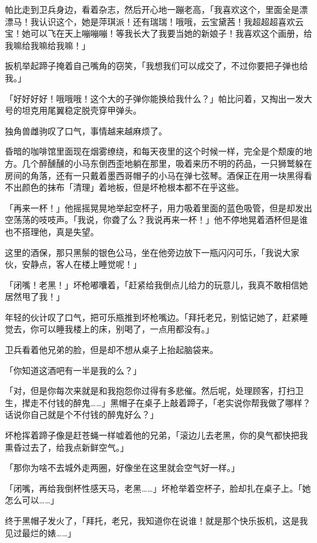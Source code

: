 帕比走到卫兵身边，看着杂志，然后开心地一蹦老高，「我喜欢这个，里面全是漂漂马！我认识这个，她是萍琪派！还有瑞瑞！哦哦，云宝黛茜！我超超超喜欢云宝！她可以飞在天上嘣嘣嘣！等我长大了我要当她的新娘子！我喜欢这个画册，给我嘛给我嘛给我嘛！」

扳机举起蹄子掩着自己嘴角的窃笑，「我想我们可以成交了，不过你要把子弹也给我。」

「好好好好！哦哦哦！这个大的子弹你能换给我什么？」帕比问着，又掏出一发大号的坦克用尾翼稳定脱壳穿甲弹头。

独角兽雌驹叹了口气，事情越来越麻烦了。

\horizonline


昏暗的咖啡馆里面现在烟雾缭绕，和每天夜里的这个时候一样，完全是个颓废的地方。几个醉醺醺的小马东倒西歪地躺在那里，吸着来历不明的药品，一只狮鹫躲在房间的角落，还有一只戴着墨西哥帽子的小马在弹七弦琴。酒保正在用一块黑得看不出颜色的抹布「清理」着地板，但是坏枪根本都不在乎这些。

「再来一杯！」他摇摇晃晃地举起空杯子，用力吸着里面的蓝色吸管，但是却发出空荡荡的吱吱声。「我说，你聋了么？我说再来一杯！」他不停地晃着酒杯但是谁也不搭理他，真是失望。

这里的酒保，那只黑鬃的银色公马，坐在他旁边放下一瓶闪闪可乐，「我说大家伙，安静点，客人在楼上睡觉呢！」

「闭嘴！老黑！」坏枪嘟囔着，「赶紧给我倒点儿给力的玩意儿，我真不敢相信她居然甩了我！」

年轻的伙计叹了口气，把可乐瓶推到坏枪嘴边。「拜托老兄，别惦记她了，赶紧睡觉去，你可以睡我楼上的床，别喝了，一点用都没有。」

卫兵看着他兄弟的脸，但是却不想从桌子上抬起脑袋来。

「你知道这酒吧有一半是我的么？」

「对，但是你每次来就是和我抱怨你过得有多悲催。然后呢，处理顾客，打扫卫生，撵走不付钱的醉鬼……」黑帽子在桌子上敲着蹄子，「老实说你帮我做了哪样？话说你自己就是个不付钱的醉鬼好么？」

坏枪挥着蹄子像是赶苍蝇一样嘘着他的兄弟，「滚边儿去老黑，你的臭气都快把我熏昏过去了，给我点新鲜空气。」

「那你为啥不去城外走两圈，好像坐在这里就会空气好一样。」

「闭嘴，再给我倒杯性感天马，老黑……」坏枪举着空杯子，脸却扎在桌子上。「她怎么可以……」

终于黑帽子发火了，「拜托，老兄，我知道你在说谁！就是那个快乐扳机，这是我见过最烂的婊……」

